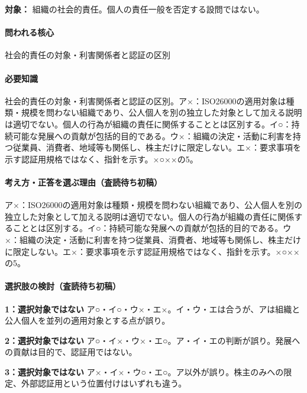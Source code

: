 \noindent\textbf{対象：} 組織の社会的責任。個人の責任一般を否定する設問ではない。\par

\paragraph{問われる核心} 社会的責任の対象・利害関係者と認証の区別

\paragraph{必要知識} 社会的責任の対象・利害関係者と認証の区別。ア×：ISO26000の適用対象は種類・規模を問わない組織であり、公人個人を別の独立した対象として加える説明は適切でない。個人の行為が組織の責任に関係することとは区別する。イ○：持続可能な発展への貢献が包括的目的である。ウ×：組織の決定・活動に利害を持つ従業員、消費者、地域等も関係し、株主だけに限定しない。エ×：要求事項を示す認証用規格ではなく、指針を示す。×○××の5。

\paragraph{考え方・正答を選ぶ理由（査読待ち初稿）} ア×：ISO26000の適用対象は種類・規模を問わない組織であり、公人個人を別の独立した対象として加える説明は適切でない。個人の行為が組織の責任に関係することとは区別する。イ○：持続可能な発展への貢献が包括的目的である。ウ×：組織の決定・活動に利害を持つ従業員、消費者、地域等も関係し、株主だけに限定しない。エ×：要求事項を示す認証用規格ではなく、指針を示す。×○××の5。

\paragraph{選択肢の検討（査読待ち初稿）}\mbox{}\par

\noindent\textbf{1：選択対象ではない} ア○・イ○・ウ×・エ×。イ・ウ・エは合うが、アは組織と公人個人を並列の適用対象とする点が誤り。\par

\noindent\textbf{2：選択対象ではない} ア○・イ×・ウ×・エ○。ア・イ・エの判断が誤り。発展への貢献は目的で、認証用ではない。\par

\noindent\textbf{3：選択対象ではない} ア×・イ×・ウ○・エ○。ア以外が誤り。株主のみへの限定、外部認証用という位置付けはいずれも違う。\par

